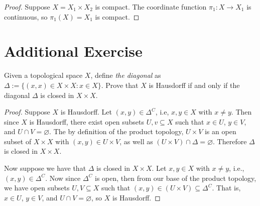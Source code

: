 \documentclass[12pt]{article}
\newenvironment{problem}
    {\begin{lrbox}{\mybox}\begin{minipage}{\textwidth-10pt}}
    {\end{minipage}\end{lrbox}\framebox[6.5in]{\usebox{\mybox}}}
\let\emptyset\varnothing
\begin{document}
\begin{proof}
    Suppose $X=X_1\times X_2$ is compact. The coordinate function $\pi_1:X\to X_1$ is continuous, so $\pi_1(X)=X_1$ is compact.
    
\end{proof}

\section*{Additional Exercise}
\begin{problem}
    Given a topological space $X$, define \emph{the diagonal} as $\Delta := \{(x,x)\in X\times X : x\in X\}$. Prove that $X$ is Hausdorff if and only if the diagonal $\Delta$ is closed in $X\times X$. 
\end{problem}

\begin{proof}
    Suppose $X$ is Hausdorff. Let $(x,y)\in\Delta^C$, i.e, $x,y\in X$ with $x\ne y$. Then since $X$ is Hausdorff, there exist open subsets $U,v\subseteq X$ such that $x\in U$, $y\in V$, and $U\cap V = \emptyset$. The by definition of the product topology, $U\times V$ is an open subset of $X\times X$ with $(x,y)\in U\times V$, as well as $(U\times V)\cap\Delta = \emptyset$. Therefore $\Delta$ is closed in $X\times X$.
    
    Now suppose we have that $\Delta$ is closed in $X\times X$. Let $x,y\in X$ with $x\ne y$, i.e., $(x,y)\in\Delta^C$. Now since $\Delta^C$ is open, then from our base of the product topology, we have open subsets $U,V\subseteq X$ such that $(x,y)\in(U\times V)\subseteq \Delta^C$. That is, $x\in U$, $y\in V$, and $U\cap V = \emptyset$, so $X$ is Hausdorff.
    
\end{proof}
\end{document}
